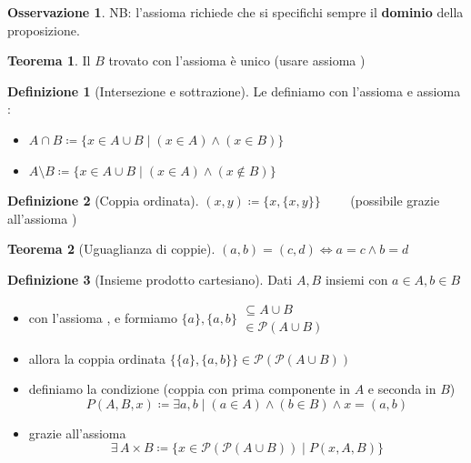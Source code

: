 \documentclass[a4paper,10pt]{article}
\theoremstyle{definition}
\theoremstyle{indentdefinition}
\newtheorem{defn}{Definizione}[section]
\theoremstyle{indentpostulate}
\theoremstyle{indenttheorem}
\newtheorem{thm}{Teorema}[section]
\theoremstyle{myremark}
\newtheorem*{rem*}{Osservazione}
\theoremstyle{indentgeneral}
\begin{document}
\begin{rem*}
    NB: l'assioma richiede che si specifichi sempre il \textbf{dominio} della proposizione.
\end{rem*}

\begin{thm}
    Il $B$ trovato con l'assioma  è unico (usare assioma )
\end{thm}

\begin{defn}[Intersezione e sottrazione] Le definiamo con l'assioma  e assioma :
\begin{itemize}
    \item $A\cap B\coloneqq\{x\in A\cup B\mid (x\in A)\land (x\in B)\}$
     \item $A\setminus B\coloneqq\{x\in A\cup B\mid (x\in A)\land (x\notin B)\}$
\end{itemize}
\end{defn}

\begin{defn}[Coppia ordinata] $(x,y)\coloneqq\{x, \{x,y\}\}\qquad$ (possibile grazie all'assioma )
\end{defn}

\begin{thm}[Uguaglianza di coppie]
    $(a,b)=(c,d)\iff a=c\land b=d$ 
\end{thm}

\begin{defn}[Insieme prodotto cartesiano]
    Dati $A,B$ insiemi con $a\in A,b\in B$
    \begin{itemize}
        \item con l'assioma ,  e  formiamo $\{a\},\{a,b\}\begin{array}{l}
             \subseteq A\cup B  \\
             \in\mathscr{P}(A\cup B)
        \end{array}$
        \item allora la coppia ordinata $\{\{a\},\{a,b\}\}\in\mathscr{P}(\mathscr{P}(A\cup B))$
        \item definiamo la condizione (coppia con prima componente in $A$ e seconda in $B$) $$P(A,B,x)\coloneqq \exists a,b\mid (a\in  A)\land (b\in B)\land x=(a,b) $$
        \item grazie all'assioma  
        $$\exists\, A\times B\coloneqq\{x\in\mathscr{P}(\mathscr{P}(A\cup B))\mid P(x,A,B)\}$$
    \end{itemize}
\end{defn}
\end{document}
